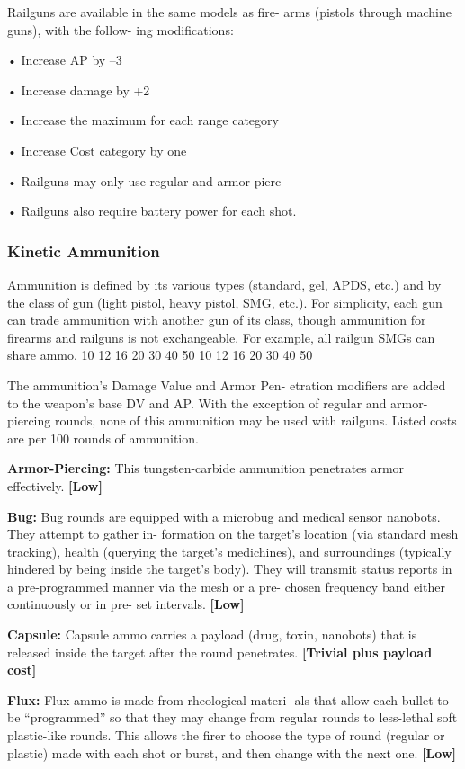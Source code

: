 Railguns are available in the same models as fire-
arms (pistols through machine guns), with the follow-
ing modifications:

•  Increase AP by –3

•  Increase damage by +2

•  Increase the maximum for each range category 

•  Increase Cost category by one

•  Railguns may only use regular and armor-pierc-

•  Railguns also require battery power for each shot. 

\subsubsection{Kinetic Ammunition}

Ammunition is defined by its various types (standard, 
gel, APDS, etc.) and by the class of gun (light pistol, 
heavy pistol, SMG, etc.). For simplicity, each gun 
can trade ammunition with another gun of its class, 
though ammunition for firearms and railguns is not 
exchangeable. For example, all railgun SMGs can 
share ammo.
10
12
16
20
30
40
50
10
12
16
20
30
40
50

The ammunition's Damage Value and Armor Pen-
etration modifiers are added to the weapon's base 
DV and AP. With the exception of regular and armor-
piercing rounds, none of this ammunition may be 
used with railguns. Listed costs are per 100 rounds 
of ammunition.

\textbf{Armor-Piercing: }This tungsten-carbide ammunition 
penetrates armor effectively. \textbf{[Low]}

\textbf{Bug: }Bug rounds are equipped with a microbug and 
medical sensor nanobots. They attempt to gather in-
formation on the target's location (via standard mesh 
tracking), health (querying the target's medichines), 
and surroundings (typically hindered by being inside 
the target's body). They will transmit status reports 
in a pre-programmed manner via the mesh or a pre-
chosen frequency band either continuously or in pre-
set intervals. \textbf{[Low]}

\textbf{Capsule:} Capsule ammo carries a payload (drug, 
toxin, nanobots) that is released inside the target after 
the round penetrates. \textbf{[Trivial plus payload cost]}

\textbf{Flux:} Flux ammo is made from rheological materi-
als that allow each bullet to be ``programmed'' so that 
they may change from regular rounds to less-lethal soft 
plastic-like rounds. This allows the firer to choose the 
type of round (regular or plastic) made with each shot 
or burst, and then change with the next one. \textbf{[Low]}

